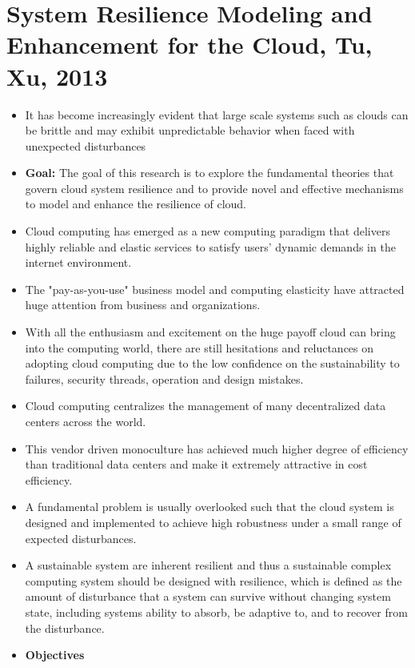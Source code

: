 \section{System Resilience Modeling and Enhancement for the Cloud, Tu, Xu, 2013}

\begin{itemize}
	\item It has become increasingly evident that large scale systems such as clouds can be brittle and may exhibit unpredictable behavior when faced with unexpected disturbances
	\item \textbf{Goal:} The goal of this research is to explore the fundamental theories that govern cloud system resilience and to provide novel and effective mechanisms to model and enhance the resilience of cloud.
	\item Cloud computing has emerged as a new computing paradigm that delivers highly reliable and elastic services to satisfy users' dynamic demands in the internet environment.
	\item The "pay-as-you-use" business model and computing elasticity have attracted huge attention from business and organizations. 
	\item With all the enthusiasm and excitement on the huge payoff cloud can bring into the computing world, there are still hesitations and reluctances on adopting cloud computing  due to the low confidence on the sustainability to failures, security threads, operation and design mistakes.
	\item Cloud computing centralizes the management of many decentralized data centers across the world.
	\item This vendor driven monoculture has achieved much higher degree of efficiency than traditional data centers and make it extremely attractive in cost efficiency.
	\item A fundamental problem is usually overlooked such that the cloud system is designed and implemented to achieve high robustness under a small range of expected disturbances. 
	\item A sustainable system are inherent resilient and thus a sustainable complex computing system should be designed with resilience, which is defined as the amount of disturbance that a system can survive without changing system state, including systems ability to absorb, be adaptive to, and to recover from the disturbance.
	\item \textbf{Objectives}
	\begin{itemize}

\end{itemize}
\end{itemize}
